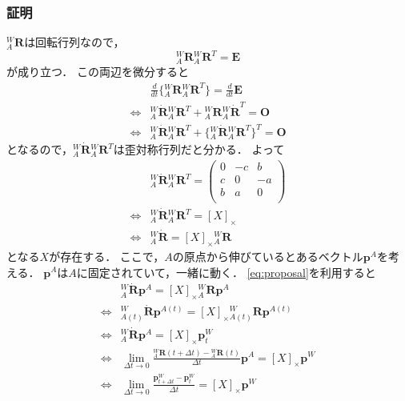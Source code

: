\subsubsection{証明}
${}^{W}_{A}\boldsymbol{R}$は回転行列なので，
\begin{equation}
  {}^{W}_{A}\boldsymbol{R} {}^{W}_{A}\boldsymbol{R}^{T} = \boldsymbol{E}
\end{equation}
が成り立つ．
この両辺を微分すると
\begin{align}
  & \frac{d}{dt}\{{}^{W}_{A}\boldsymbol{R} {}^{W}_{A}\boldsymbol{R}^{T}\} = \frac{d}{dt}\boldsymbol{E}\\
  \Leftrightarrow & {}^{W}_{A}\dot{\boldsymbol{R}} {}^{W}_{A}\boldsymbol{R}^{T} + {}^{W}_{A}\boldsymbol{R} {}^{W}_{A}\dot{\boldsymbol{R}}^{T} = \boldsymbol{O}\\
  \Leftrightarrow & {}^{W}_{A}\dot{\boldsymbol{R}} {}^{W}_{A}\boldsymbol{R}^{T} + \{{}^{W}_{A}\dot{\boldsymbol{R}} {}^{W}_{A}\boldsymbol{R}^{T}\}^{T} = \boldsymbol{O}
\end{align}
となるので，${}^{W}_{A}\dot{\boldsymbol{R}} {}^{W}_{A}\boldsymbol{R}^{T}$は歪対称行列だと分かる．
よって
\begin{align}
  & {}^{W}_{A}\dot{\boldsymbol{R}} {}^{W}_{A}\boldsymbol{R}^{T} =
  \begin{pmatrix}
    0 & -c & b\\
    c &  0 & -a\\
    b &  a & 0\\
  \end{pmatrix}\\
  \Leftrightarrow & {}^{W}_{A}\dot{\boldsymbol{R}} {}^{W}_{A}\boldsymbol{R}^{T} = [X]_{\times}\\
  \Leftrightarrow & {}^{W}_{A}\dot{\boldsymbol{R}} = [X]_{\times} {}^{W}_{A}\boldsymbol{R} \label{eq:proposal}
\end{align}
となる$X$が存在する．
ここで，$A$の原点から伸びているとあるベクトル$\boldsymbol{p}^{A}$を考える．
$\boldsymbol{p}^{A}$は$A$に固定されていて，一緒に動く．
\autoref{eq:proposal}を利用すると
\begin{align}
  & {}^{W}_{A}\dot{\boldsymbol{R}} \boldsymbol{p}^{A} = [X]_{\times} {}^{W}_{A}\boldsymbol{R} \boldsymbol{p}^{A}\\
  \Leftrightarrow & {}^{W}_{A(t)}\dot{\boldsymbol{R}} \boldsymbol{p}^{A(t)} = [X]_{\times} {}^{W}_{A(t)}\boldsymbol{R} \boldsymbol{p}^{A(t)}\\
  \Leftrightarrow & {}^{W}_{A}\dot{\boldsymbol{R}} \boldsymbol{p}^{A} = [X]_{\times} \boldsymbol{p}^{W}_{t}\\
  \Leftrightarrow & \lim_{\Delta t \to 0} \frac{{}^{W}_{A}\boldsymbol{R}(t+ \Delta t) - {}^{W}_{A}\boldsymbol{R}(t)}{\Delta t} \boldsymbol{p}^{A} = [X]_{\times} \boldsymbol{p}^{W}\\
  \Leftrightarrow & \lim_{\Delta t \to 0} \frac{\boldsymbol{p}^{W}_{t+ \Delta t} - \boldsymbol{p}^{W}_{t}}{\Delta t} = [X]_{\times} \boldsymbol{p}^{W} \label{eq:bibun}
\end{align}

